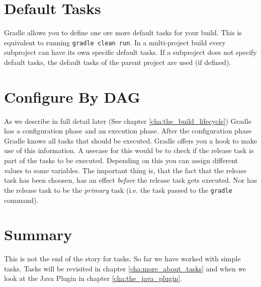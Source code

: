 \section{Default Tasks} %
\label{sec:default_tasks}
Gradle allows you to define one ore more default tasks for your build. 
This is equivalent to running \texttt{gradle clean run}. In a multi-project build every subproject can have its own specific default tasks. If a subproject does not specify default tasks, the default tasks of the parent project are used (if defined).

\section{Configure By DAG}
As we describe in full detail later (See chapter \ref{cha:the_build_lifecycle}) Gradle has a configuration phase and an execution phase. After the configuration phase Gradle knows all tasks that should be executed. Gradle offers you a hook to make use of this information. A usecase for this would be to check if the release task is part of the tasks to be executed. Depending on this you can assign different values to some variables.
The important thing is, that the fact that the release task has been choosen, has an effect \emph{before} the release task gets executed. Nor has the release task to be the \emph{primary} task (i.e. the task passed to the \texttt{gradle} command). 

  
\section{Summary}
This is not the end of the story for tasks. So far we have worked with simple tasks. Tasks will be revisited in chapter \ref{cha:more_about_tasks} and when we look at the Java Plugin in chapter \ref{cha:the_java_plugin}.

